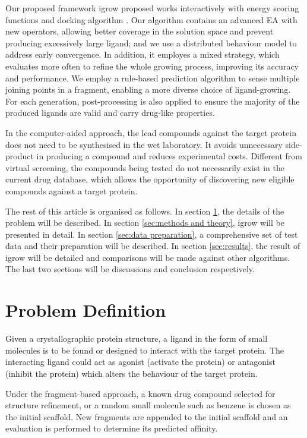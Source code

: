 \documentclass[10pt,conference,letterpaper]{IEEEtran}
\begin{document}
Our proposed framework igrow proposed works interactively with energy scoring functions \cite{ref16,ref17} and docking algorithm \cite{ref18}.
Our algorithm contains an advanced EA with new operators, allowing better coverage in the solution space and prevent producing excessively large ligand; and we use a distributed behaviour model \cite{ref21} to address early convergence.
In addition, it employes a mixed strategy, which evaluates more often to refine the whole growing process, improving its accuracy and performance.
We employ a rule-based prediction algorithm to sense multiple joining points in a fragment, enabling a more diverse choice of ligand-growing.
For each generation, post-processing is also applied to ensure the majority of the produced ligands are valid and carry drug-like properties.

In the computer-aided approach, the lead compounds against the target protein does not need to be synthesised in the wet laboratory.
It avoids unnecessary side-product in producing a compound and reduces experimental costs.
Different from virtual screening, the compounds being tested do not necessarily exist in the current drug database, which allows the opportunity of discovering new eligible compounds against a target protein.

The rest of this article is organised as follows.
In section \ref{sec:problem definition}, the details of the problem will be described.
In section \ref{sec:methods and theory}, igrow will be presented in detail.
In section \ref{sec:data preparation}, a comprehensive set of test data and their preparation will be described.
In section \ref{sec:results}, the result of igrow will be detailed and comparisons will be made against other algorithms.
The last two sections will be discussions and conclusion respectively.

\section{Problem Definition}\label{sec:problem definition}
Given a crystallographic protein structure, a ligand in the form of small molecules is to be found or designed to interact with the target protein.
The interacting ligand could act as agonist (activate the protein) or antagonist (inhibit the protein) which alters the behaviour of the target protein.

Under the fragment-based approach, a known drug compound selected for structure refinement, or a random small molecule such as benzene is chosen as the initial scaffold.
New fragments are appended to the initial scaffold and an evaluation is performed to determine its predicted affinity.
\end{document}
